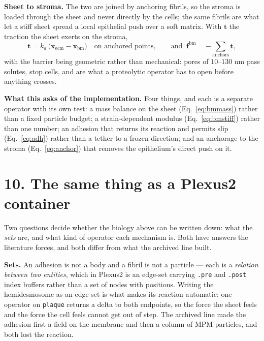 \documentclass[10pt,a4paper]{article}
\newcommand{\code}[1]{\texttt{#1}}
\begin{document}
\textbf{Sheet to stroma.} The two are joined by anchoring fibrils, so the stroma is loaded through the
sheet and never directly by the cells; the same fibrils are what let a stiff sheet spread a local
epithelial push over a soft matrix. With $\mathbf t$ the traction the sheet exerts on the stroma,
%
\begin{equation}
\mathbf t = k_a\,\bigl(\mathbf x_{\text{ecm}}-\mathbf x_{\text{bm}}\bigr)\quad\text{on anchored
points},\qquad
\text{and }\ \mathbf f^{\text{bm}} = -\!\!\sum_{\text{anchors}}\!\mathbf t ,
\label{eq:anchor}
\end{equation}
%
with the barrier being geometric rather than mechanical: pores of $10$--$130$ nm pass solutes, stop
cells, and are what a proteolytic operator has to open before anything crosses.

\textbf{What this asks of the implementation.} Four things, and each is a separate operator with its
own test: a mass balance on the sheet (Eq.~\ref{eq:bmmass}) rather than a fixed particle budget; a
strain-dependent modulus (Eq.~\ref{eq:bmstiff}) rather than one number; an adhesion that returns its
reaction and permits slip (Eq.~\ref{eq:adh}) rather than a tether to a frozen direction; and an
anchorage to the stroma (Eq.~\ref{eq:anchor}) that removes the epithelium's direct push on it.

\section*{10.\; The same thing as a Plexus2 container}

Two questions decide whether the biology above can be written down: what the \emph{sets} are, and what
kind of operator each mechanism is. Both have answers the literature forces, and both differ from what
the archived line built.

\textbf{Sets.} An adhesion is not a body and a fibril is not a particle --- each is a \emph{relation
between two entities}, which in Plexus2 is an edge-set carrying \code{.pre} and \code{.post} index
buffers rather than a set of nodes with positions. Writing the hemidesmosome as an edge-set is what
makes its reaction automatic: one operator on \code{plaque} returns a delta to both endpoints, so the
force the sheet feels and the force the cell feels cannot get out of step. The archived line made the
adhesion first a field on the membrane and then a column of MPM particles, and both lost the reaction.
\end{document}
